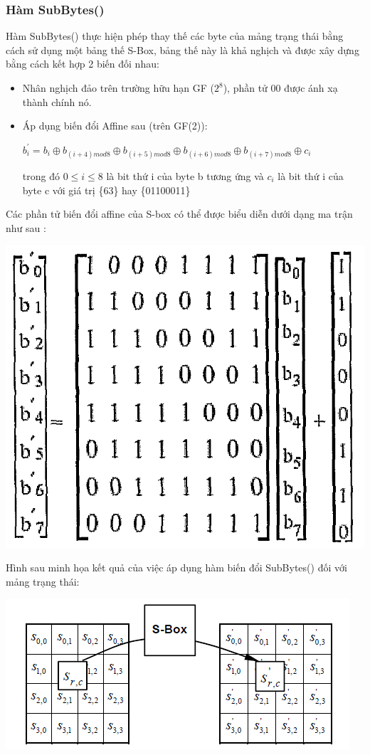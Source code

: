 \documentclass[paper=a4, fontsize=11pt]{scrartcl}	%
\numberwithin{equation}{section}															%
\numberwithin{figure}{section}																%
\numberwithin{table}{section}																%
\begin{document}
		\subsubsection{Hàm SubBytes()}
		Hàm SubBytes() thực hiện phép thay thế các byte của mảng trạng thái bằng cách sử dụng một bảng thế S-Box, bảng thế này là khả nghịch và được xây dựng bằng cách kết hợp 2 biến đối nhau:
		\begin{itemize}
		\item Nhân nghịch đảo trên trường hữu hạn GF ($2^8$), phần tử {00} được ánh xạ thành chính nó.
		\item Áp dụng biến đổi Affine sau (trên GF(2)): 
		\begin{center}
		$b^{'}_{i} = b_i \oplus b_{(i+4)mod 8} \oplus b_{(i+5)mod 8} \oplus b_{(i+6)mod 8} \oplus b_{(i+7)mod 8} \oplus c_i$
		\end{center}
		trong đó $0 \le i \le 8$ là bit thứ i của byte b tương ứng và $c_i$ là bit thứ i của byte c với giá trị \{63\} hay \{01100011\}	
		\end{itemize}
		Các phần tử biến đổi affine của S-box có thể được biểu diễn dưới dạng ma trận như sau :
		\begin{center}
		\includegraphics[scale=0.3]{AES_SBOX_1}
		\end{center}
		Hình sau minh họa kết quả của việc áp dụng hàm biến đổi SubBytes() đối với mảng trạng thái:
		\begin{center}
		\includegraphics[scale=0.7]{AES_SBOX_2}
		\end{center}
\end{document}

